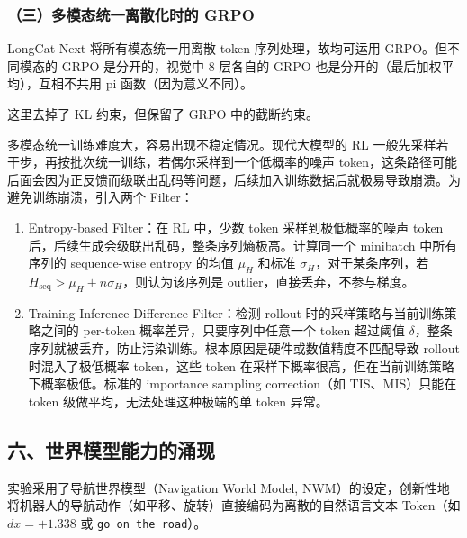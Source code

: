 \hypertarget{ux4e09ux591aux6a21ux6001ux7edfux4e00ux79bbux6563ux5316ux65f6ux7684-grpo}{%
\subsubsection{（三）多模态统一离散化时的 GRPO}\label{ux4e09ux591aux6a21ux6001ux7edfux4e00ux79bbux6563ux5316ux65f6ux7684-grpo}}

LongCat-Next 将所有模态统一用离散 token 序列处理，故均可运用 GRPO。但不同模态的 GRPO 是分开的，视觉中 8 层各自的 GRPO 也是分开的（最后加权平均），互相不共用 pi 函数（因为意义不同）。

这里去掉了 KL 约束，但保留了 GRPO 中的截断约束。

多模态统一训练难度大，容易出现不稳定情况。现代大模型的 RL 一般先采样若干步，再按批次统一训练，若偶尔采样到一个低概率的噪声 token，这条路径可能后面会因为正反馈而级联出乱码等问题，后续加入训练数据后就极易导致崩溃。为避免训练崩溃，引入两个 Filter：

\begin{enumerate}
\def\labelenumi{\arabic{enumi}.}
\tightlist
\item
  Entropy-based Filter：在 RL 中，少数 token 采样到极低概率的噪声 token 后，后续生成会级联出乱码，整条序列熵极高。计算同一个 minibatch 中所有序列的 sequence-wise entropy 的均值 \(\mu_H\) 和标准 \(\sigma_H\)，对于某条序列，若 \(H_{\mathrm{seq}}>\mu_H+n\sigma_H\)，则认为该序列是 outlier，直接丢弃，不参与梯度。
\item
  Training-Inference Difference Filter：检测 rollout 时的采样策略与当前训练策略之间的 per-token 概率差异，只要序列中任意一个 token 超过阈值 \(\delta\)，整条序列就被丢弃，防止污染训练。根本原因是硬件或数值精度不匹配导致 rollout 时混入了极低概率 token，这些 token 在采样下概率很高，但在当前训练策略下概率极低。标准的 importance sampling correction（如 TIS、MIS）只能在 token 级做平均，无法处理这种极端的单 token 异常。
\end{enumerate}

\hypertarget{ux516dux4e16ux754cux6a21ux578bux80fdux529bux7684ux6d8cux73b0}{%
\subsection{六、世界模型能力的涌现}\label{ux516dux4e16ux754cux6a21ux578bux80fdux529bux7684ux6d8cux73b0}}

实验采用了导航世界模型（Navigation World Model, NWM）的设定，创新性地将机器人的导航动作（如平移、旋转）直接编码为离散的自然语言文本 Token（如 \(dx=+1.338\) 或 \texttt{go\ on\ the\ road}）。

